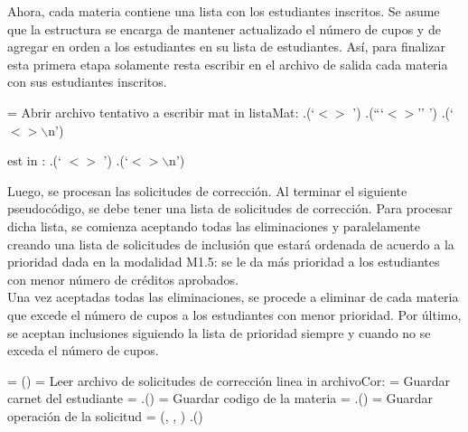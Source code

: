 \documentclass[11pt]{article}
\begin{document}
   Ahora, cada materia contiene una lista con los estudiantes inscritos. Se
   asume que la estructura se encarga de mantener actualizado el número de
   cupos y de agregar en orden a los estudiantes en su lista de estudiantes.
   Así, para finalizar esta primera etapa solamente resta escribir en el
   archivo de salida cada materia con sus estudiantes inscritos.

   \begin{codebox}
      \li {} = Abrir archivo tentativo a escribir
      \li \For mat in listaMat:
      \Do
         \li {}.(`$<$$>$ ')
         \li {}.(```$<$$>$'' ')
         \li {}.(`$<$$>\backslash$n')
         
         \li \For est in :
         \Do
            \li {}.(`   $<$$>$ ')
            \li {}.(`$<$$>\backslash$n') \label{li:Generar-Archivo-Tentativo-final}
            \End
         \End
         \End
      \End
   \end{codebox}

   Luego, se procesan las solicitudes de corrección. Al terminar el siguiente pseudocódigo, 
   se debe tener una lista de solicitudes de corrección. Para procesar dicha lista, se comienza
   aceptando todas las eliminaciones y paralelamente creando una lista de solicitudes de inclusión
   que estará ordenada de acuerdo a la prioridad dada en la modalidad M1.5: se le da más prioridad a los 
   estudiantes con menor número de créditos aprobados. \\

   Una vez aceptadas todas las eliminaciones, se procede a eliminar de cada materia que
   excede el número de cupos a los estudiantes con menor prioridad. Por último, se aceptan
   inclusiones siguiendo la lista de prioridad siempre y cuando no se exceda el número de cupos.

   \begin{codebox}
      \li {} =  ()
      \li {} = Leer archivo de solicitudes de corrección
      \li \For linea in archivoCor:
      \li \Do
          = Guardar carnet del estudiante
         \li {} = .()
         \li {} = Guardar codigo de la materia
         \li {} = .()
         \li {} = Guardar operación de la solicitud
         \li {} =  (, , )
         \li {}.() \label{li:Extraer-Datos-Correccion-final}
         \End
      \End
   \end{codebox}
\end{document}
